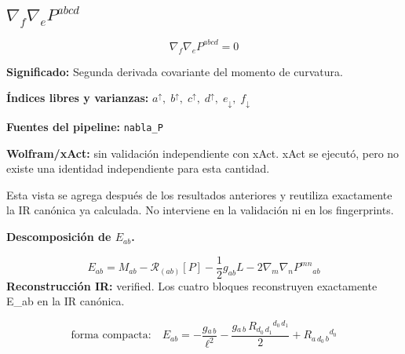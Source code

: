 \documentclass[11pt]{article}
\begin{document}
\subsection*{$ \nabla_f\nabla_e P^{abcd} $}
\begin{dmath*}[breakdepth={5}]
\nabla_f\nabla_e P^{abcd} = 0
\end{dmath*}
\par\vspace{1.2\baselineskip}\noindent
\begin{minipage}{\linewidth}
\textbf{Significado:} Segunda derivada covariante del momento de curvatura.\par
\textbf{Índices libres y varianzas:} $ a^{\uparrow},\;b^{\uparrow},\;c^{\uparrow},\;d^{\uparrow},\;e_{\downarrow},\;f_{\downarrow} $\par
\textbf{Fuentes del pipeline:} \texttt{nabla\_P}\par
\textbf{Wolfram/xAct:} sin validación independiente con xAct. xAct se ejecutó, pero no existe una identidad independiente para esta cantidad.\par
\end{minipage}
\par\bigskip{}\par
Esta vista se agrega después de los resultados anteriores y reutiliza exactamente la IR canónica ya calculada. No interviene en la validación ni en los fingerprints.\par
{}
\par\medskip\noindent\textbf{Descomposición de $ E_{ab} $.}\par
\begin{dmath*}[breakdepth={5}]
E_{ab}=M_{ab}-\mathcal{R}_{(ab)}[P]-\frac{1}{2}g_{ab}L-2\nabla_m\nabla_nP^{mn}{}_{ab}
\end{dmath*}
\textbf{Reconstrucción IR:} verified. Los cuatro bloques reconstruyen exactamente E\_ab en la IR canónica.\par
\begin{dmath*}[breakdepth={5}]
\text{forma compacta:}\quad E_{ab} = -\frac{g{}_{a\,b}}{{\ell}^{2}} - \frac{g{}_{a\,b}\,R{}_{d_{0}\,d_{1}}{}^{d_{0}\,d_{1}}}{2} + R{}_{a\,d_{0}\,b}{}^{d_{0}}
\end{dmath*}
\end{document}
